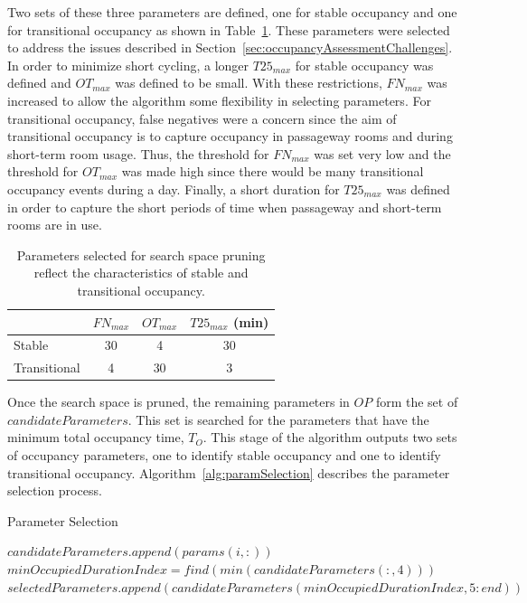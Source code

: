 Two sets of these three parameters are defined, one for stable occupancy and one
for transitional occupancy as shown in Table~\ref{table:pruningParams}. These
parameters were selected to address the issues described in
Section~\ref{sec:occupancyAssessmentChallenges}. In order to minimize short
cycling, a longer $T25_{max}$ for stable occupancy was defined and $OT_{max}$
was defined to be small. With these restrictions, $FN_{max}$ was increased to
allow the algorithm some flexibility in selecting parameters. For transitional
occupancy, false negatives were a concern since the aim of transitional
occupancy is to capture occupancy in passageway rooms and during short-term room
usage. Thus, the threshold for $FN_{max}$ was set very low and the threshold for
$OT_{max}$ was made high since there would be many transitional occupancy events
during a day. Finally, a short duration for $T25_{max}$ was defined in order to
capture the short periods of time when passageway and short-term rooms are in
use.

\begin{table}[!htb]
\centering
\begin{minipage}{\columnwidth}
\centering
\begin{tabular}{|l|c|c|c|}
\cline{2-4}
\multicolumn{1}{c|}{}&$FN_{max}$&$OT_{max}$&$T25_{max}$ (min)\\
\hline
Stable&30&4&30\\
\hline
Transitional&4&30&3\\
\hline
\end{tabular}
\end{minipage}
\smallskip
\caption[Threshold used to search for occupancy parameters]{Parameters selected
for search space pruning reflect the characteristics of stable and transitional
occupancy.}
\label{table:pruningParams}
\end{table}

Once the search space is pruned, the remaining parameters in $OP$ form the set
of $candidateParameters$. This set is searched for the parameters that have the
minimum total occupancy time, $T_O$. This stage of the algorithm outputs two
sets of occupancy parameters, one to identify stable occupancy and one to
identify transitional occupancy. Algorithm~\ref{alg:paramSelection} describes
the parameter selection process.

\begin{algorithm} [!htb]                     %
\caption{Parameter Selection}          %
\label{alg:paramSelection}                           %
\begin{algorithmic}                    %
\STATE $candidateParameters.append(params(i, :))$
\ENDIF 
\ENDFOR
\STATE $minOccupiedDurationIndex = find(min(candidateParameters(:, 4)))$
\STATE $selectedParameters.append(candidateParameters(minOccupiedDurationIndex, 5:end))$
\end{algorithmic}
\end{algorithm}

